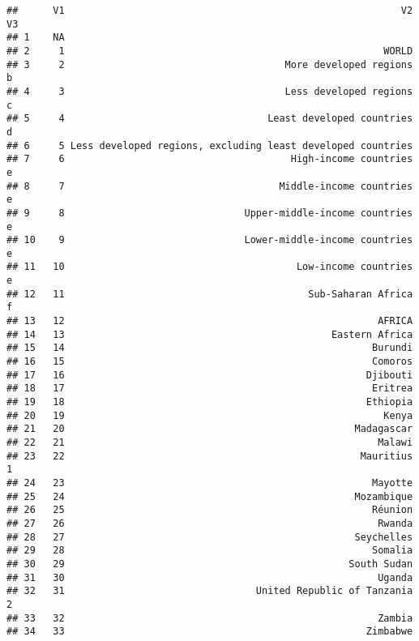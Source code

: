 \documentclass[]{article}
\begin{document}
\begin{verbatim}
##      V1                                                          V2 V3
## 1    NA                                                               
## 2     1                                                       WORLD   
## 3     2                                      More developed regions  b
## 4     3                                      Less developed regions  c
## 5     4                                   Least developed countries  d
## 6     5 Less developed regions, excluding least developed countries   
## 7     6                                       High-income countries  e
## 8     7                                     Middle-income countries  e
## 9     8                               Upper-middle-income countries  e
## 10    9                               Lower-middle-income countries  e
## 11   10                                        Low-income countries  e
## 12   11                                          Sub-Saharan Africa  f
## 13   12                                                      AFRICA   
## 14   13                                              Eastern Africa   
## 15   14                                                     Burundi   
## 16   15                                                     Comoros   
## 17   16                                                    Djibouti   
## 18   17                                                     Eritrea   
## 19   18                                                    Ethiopia   
## 20   19                                                       Kenya   
## 21   20                                                  Madagascar   
## 22   21                                                      Malawi   
## 23   22                                                   Mauritius  1
## 24   23                                                     Mayotte   
## 25   24                                                  Mozambique   
## 26   25                                                     Réunion   
## 27   26                                                      Rwanda   
## 28   27                                                  Seychelles   
## 29   28                                                     Somalia   
## 30   29                                                 South Sudan   
## 31   30                                                      Uganda   
## 32   31                                 United Republic of Tanzania  2
## 33   32                                                      Zambia   
## 34   33                                                    Zimbabwe   

\end{verbatim}
\end{document}
